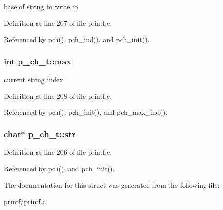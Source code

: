base of string to write to 



Definition at line 207 of file printf.\+c.



Referenced by pch(), pch\+\_\+ind(), and pch\+\_\+init().

\subsubsection[{\texorpdfstring{max}{max}}]{\setlength{\rightskip}{0pt plus 5cm}int p\+\_\+ch\+\_\+t\+::max}\hypertarget{structp__ch__t_a0dee9f28e498d427e53051b7e1846d34}{}\label{structp__ch__t_a0dee9f28e498d427e53051b7e1846d34}


current string index 



Definition at line 208 of file printf.\+c.



Referenced by pch(), pch\+\_\+init(), and pch\+\_\+max\+\_\+ind().

\subsubsection[{\texorpdfstring{str}{str}}]{\setlength{\rightskip}{0pt plus 5cm}char$\ast$ p\+\_\+ch\+\_\+t\+::str}\hypertarget{structp__ch__t_aa3c8616342a2717bc714bf1b6d00516f}{}\label{structp__ch__t_aa3c8616342a2717bc714bf1b6d00516f}


Definition at line 206 of file printf.\+c.



Referenced by pch(), and pch\+\_\+init().



The documentation for this struct was generated from the following file\+:\begin{DoxyCompactItemize}
\item 
printf/\hyperlink{printf_8c}{printf.\+c}\end{DoxyCompactItemize}
